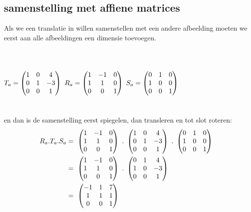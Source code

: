 \subsection{samenstelling met affiene matrices}
Als we een translatie in \RT willen samenstellen met een andere afbeelding moeten we eerst aan alle afbeeldingen een dimensie toevoegen. \\ \\
  \\ \\ 
$ T_a = \begin{pmatrix}  1 & 0 & 4  \\  0 & 1 & -3  \\ 0 & 0 & 1  \end{pmatrix} $  \qquad
$ R_a = \begin{pmatrix}  1 & -1 & 0  \\  1 & 1 & 0  \\ 0 & 0 & 1  \end{pmatrix} $ \qquad
$ S_a = \begin{pmatrix}  0 & 1 & 0  \\  1 & 0 & 0  \\ 0 & 0 & 1  \end{pmatrix} $ \\ \\ \\
en dan is de samenstelling eerst spiegelen, dan transleren en tot slot roteren:
\begin{align*} 
R_a . T_a . S_a & = \ 
\matdrie{ 1 & -1 & 0 }
{ 1 & 1 & 0 }
{0 & 0 & 1 } \ . \ 
\matdrie{ 1 & 0 & 4 } 
{ 0 & 1 & -3 }
{0 & 0 & 1 } \ . \ 
\matdrie{ 0 & 1 & 0 }  
{ 1 & 0 & 0 }
{0 & 0 & 1 }   \\
& = \ 
\matdrie{ 1 & -1 & 0 }
{ 1 & 1 & 0 }
{0 & 0 & 1 } \ . \ 
\matdrie{ 0 & 1 & 4 }  
{ 1 & 0 & -3 }
{0 & 0 & 1 }   \\
& = \ 
\matdrie{ -1 & 1 & 7 }  
{ 1 & 1 & 1 }
{0 & 0 & 1 }   
\end{align*} 
